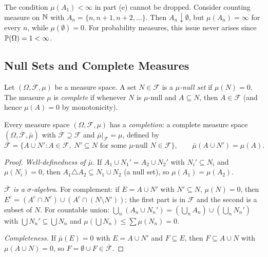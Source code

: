 \documentclass[11pt,a4paper]{article}
\begin{document}
\begin{warning}[title={Finiteness in Continuity from Above}]
The condition $\mu(A_1) < \infty$ in part (e) cannot be dropped.
Consider counting measure on $\mathbb{N}$ with $A_n = \{n, n+1, n+2, \ldots\}$.
Then $A_n \downarrow \emptyset$, but $\mu(A_n) = \infty$ for every
$n$, while $\mu(\emptyset) = 0$. For probability measures, this issue
never arises since $\mathbb{P}(\Omega) = 1 < \infty$.
\end{warning}

\subsection{Null Sets and Complete Measures}
\label{subsec:null_complete}

\begin{definition}
\label{def:null_complete}
Let $(\Omega, \mathcal{F}, \mu)$ be a measure space. A set
$N \in \mathcal{F}$ is a \emph{$\mu$-null set} if $\mu(N) = 0$. The
measure $\mu$ is \emph{complete} if whenever $N$ is $\mu$-null and
$A \subseteq N$, then $A \in \mathcal{F}$ (and hence $\mu(A) = 0$ by
monotonicity).
\end{definition}

\begin{proposition}
\label{prop:completion}
Every measure space $(\Omega, \mathcal{F}, \mu)$ has a
\emph{completion}: a complete measure space
$(\Omega, \overline{\mathcal{F}}, \bar{\mu})$ with
$\overline{\mathcal{F}} \supseteq \mathcal{F}$ and
$\bar{\mu}|_{\mathcal{F}} = \mu$, defined by
\begin{equation}
  \overline{\mathcal{F}} = \{A \cup N' : A \in \mathcal{F},\;
    N' \subseteq N \text{ for some $\mu$-null }
    N \in \mathcal{F}\},
  \qquad
  \bar{\mu}(A \cup N') = \mu(A).
  \label{eq:completion}
\end{equation}
\end{proposition}

\begin{proof}
\textit{Well-definedness of $\bar{\mu}$.} If
$A_1 \cup N_1' = A_2 \cup N_2'$ with $N_i' \subseteq N_i$ and
$\mu(N_i) = 0$, then $A_1 \triangle A_2 \subseteq N_1 \cup N_2$
(a null set), so $\mu(A_1) = \mu(A_2)$.

\textit{$\overline{\mathcal{F}}$ is a $\sigma$-algebra.}
For complement: if $E = A \cup N'$ with $N' \subseteq N$,
$\mu(N) = 0$, then
$E^c = (A^c \cap N^c) \cup (A^c \cap (N \setminus N'))$; the first
part is in $\mathcal{F}$ and the second is a subset of $N$.
For countable union: $\bigcup_n (A_n \cup N_n')
= (\bigcup_n A_n) \cup (\bigcup_n N_n')$ with
$\bigcup N_n' \subseteq \bigcup N_n$ and
$\mu(\bigcup N_n) \leq \sum \mu(N_n) = 0$.

\textit{Completeness.} If $\bar{\mu}(E) = 0$ with $E = A \cup N'$
and $F \subseteq E$, then $F \subseteq A \cup N$ with
$\mu(A \cup N) = 0$, so
$F = \emptyset \cup F \in \overline{\mathcal{F}}$.
\end{proof}
\end{document}
